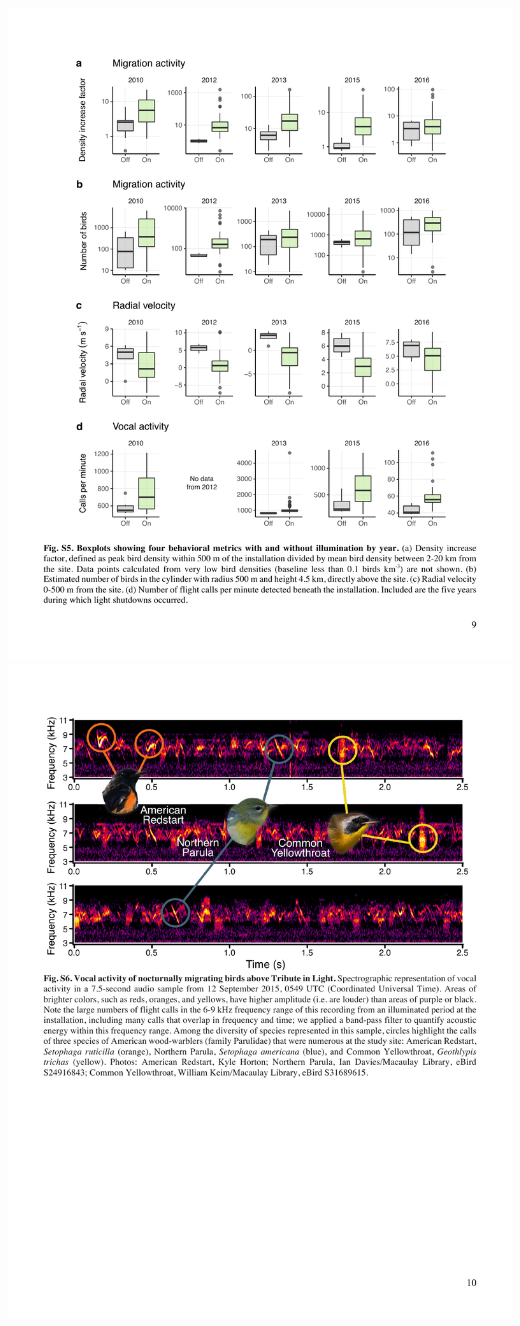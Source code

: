 \documentclass[a4paper, twoside]{templates/ociamthesis}
\begin{document}
\includegraphics[width=1\linewidth]{pdf_chapters/lights/lights_supp_crop_Part13}
\includegraphics[width=1\linewidth]{pdf_chapters/lights/lights_supp_crop_Part14}
\end{document}
